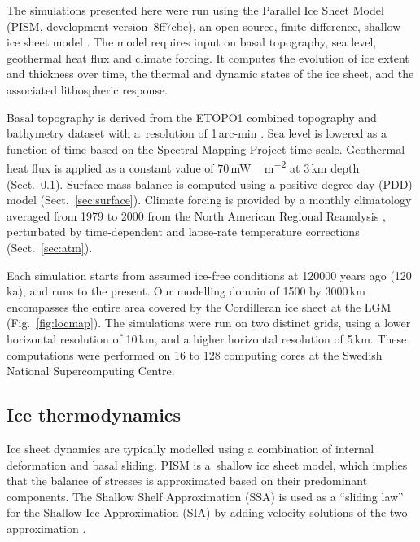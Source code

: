 \documentclass[tc]{copernicus}
\begin{document}
The simulations presented here were run using the Parallel Ice Sheet Model
(PISM, development version~8ff7cbe), an open source,
finite difference, shallow ice sheet model \citep{PISM-authors.2015}. The model
requires input on basal topography, sea level, geothermal heat flux and
climate forcing. It computes the evolution of ice extent
and thickness over time, the thermal and dynamic
states of the ice sheet, and the associated lithospheric response.

Basal topography is derived from the ETOPO1 combined topography and bathymetry
dataset with a~resolution of 1\,arc-min \citep{Amante.Eakins.2009}. Sea level
is lowered as a function of time based on the Spectral Mapping Project
\citep[SPECMAP,][]{Imbrie.etal.1989} time scale. Geothermal heat flux
is applied as a constant value of 70\,\unit{mW\,m^{-2}} at 3\,km depth
(Sect.~\ref{sec:icedyn}). Surface mass balance is computed using a positive
degree-day (PDD) model (Sect.~\ref{sec:surface}). Climate forcing is
provided by a monthly climatology averaged from 1979 to 2000 from the North
American Regional Reanalysis \citep[NARR,][]{Mesinger.etal.2006},
perturbated by time-dependent and
lapse-rate temperature corrections (Sect.~\ref{sec:atm}).

Each simulation starts from assumed ice-free conditions at 120000 years ago
(120\,ka), and runs to the present. Our modelling domain of 1500 by 3000\,km
encompasses the entire area covered by the Cordilleran ice sheet at the LGM
(Fig.~\ref{fig:locmap}). The simulations were run on two distinct grids, using
a lower horizontal resolution of 10\,km, and a higher horizontal resolution of
5\,km. These computations were performed on 16 to 128 computing cores at the
Swedish National Supercomputing Centre.

\subsection{Ice thermodynamics}
\label{sec:icedyn}

Ice sheet dynamics are typically modelled using a combination of internal
deformation and basal sliding. PISM is a~shallow ice sheet model, which implies
that the balance of stresses is approximated based on their predominant
components. The Shallow Shelf Approximation (SSA) is used as a ``sliding law''
for the Shallow Ice Approximation (SIA) by adding velocity solutions of the
two approximation
\citep[Eqns.~7--9 and 15]{Bueler.Brown.2009, Winkelmann.etal.2011}.
\end{document}
